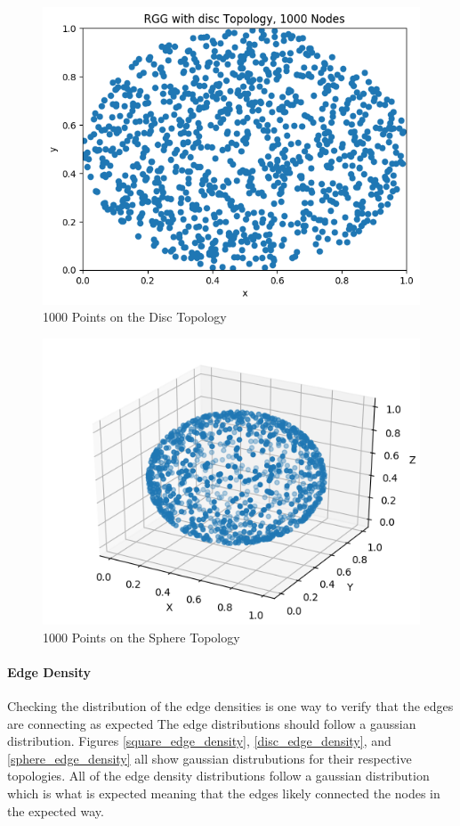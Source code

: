 \documentclass{article}
\begin{document}
    \begin{figure}
      \centering
      \label{drawing_of_disc}
      \includegraphics[width=1 \textwidth]{disc/generation/drawing/nodes.png}
      \caption{1000 Points on the Disc Topology}
    \end{figure}
    \begin{figure}
      \centering
      \label{drawing_of_sphere}
      \includegraphics[width=1 \textwidth]{sphere/generation/drawing/sphere_drawing.png}
      \caption{1000 Points on the Sphere Topology}
    \end{figure}

    \paragraph{Edge Density}
    Checking the distribution of the edge densities is one way to verify that the edges are connecting as expected
    The edge distributions should follow a gaussian distribution.
    Figures \ref{square_edge_density}, \ref{disc_edge_density}, and \ref{sphere_edge_density} all show gaussian distrubutions for their respective topologies.
    All of the edge density distributions follow a gaussian distribution which is what is expected meaning that the edges likely connected the nodes in the expected way.
\end{document}
